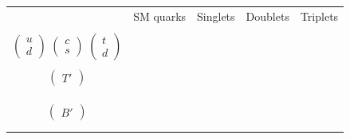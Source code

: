 \begin{table}[htb]
    \centering
    \begin{tabular}{|c|c|c|c|c|}
         \hline 
         & SM quarks & Singlets & Doublets & Triplets \\
         &
         \thead{
         \vphantom{$\begin{pmatrix}X\end{pmatrix}$} \\
         $\begin{pmatrix} u \\ d \end{pmatrix}$
         $\begin{pmatrix} c \\ s \end{pmatrix}$
         $\begin{pmatrix} t \\ d \end{pmatrix}$\\
         \vphantom{$\begin{pmatrix}Y\end{pmatrix}$} 
         }
         & 
         \thead{
         \vphantom{$\begin{pmatrix}X\end{pmatrix}$} \\
         $\begin{pmatrix} T' \end{pmatrix}$ \\
         \vphantom{$\begin{pmatrix} B' \end{pmatrix}$} \\
         \vphantom{$\begin{pmatrix}Y\end{pmatrix}$} 
         }
         \thead{
         \vphantom{$\begin{pmatrix}X\end{pmatrix}$} \\
         \vphantom{$\begin{pmatrix} T' \end{pmatrix}$} \\
         $\begin{pmatrix} B' \end{pmatrix}$ \\
         \vphantom{$\begin{pmatrix}Y\end{pmatrix}$} 
         }
         &
         \thead{
         $\begin{pmatrix} X \\ T' \end{pmatrix}$ \\
}
\end{tabular}
\end{table}
